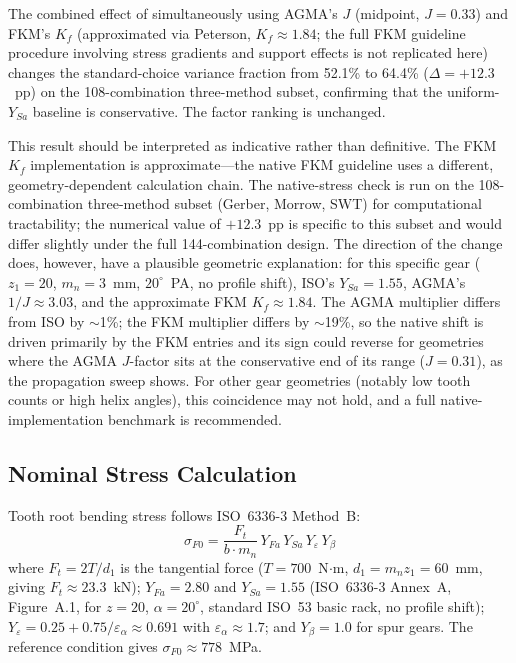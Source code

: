 \documentclass[twocolumn,12pt,a4paper]{article}
\begin{document}
The combined effect of simultaneously using AGMA's $J$ (midpoint,
$J=0.33$) and FKM's $K_f$ (approximated via Peterson,
$K_f \approx 1.84$; the full FKM guideline procedure involving stress
gradients and support effects is not replicated here) changes the
standard-choice variance fraction from 52.1\% to 64.4\%
($\Delta = +12.3$~pp) on the 108-combination three-method subset,
confirming that the uniform-$Y_{Sa}$ baseline is conservative. The
factor ranking is unchanged.

This result should be interpreted as indicative rather than
definitive. The FKM $K_f$ implementation is approximate---the native
FKM guideline uses a different, geometry-dependent calculation chain.
The native-stress check is run on the 108-combination
three-method subset (Gerber, Morrow, SWT) for computational
tractability; the numerical value of $+12.3$~pp is specific to this
subset and would differ slightly under the full 144-combination
design. The direction of the change does, however,
have a plausible geometric explanation: for this specific gear
($z_1=20$, $m_n=3$~mm, $20^\circ$~PA, no profile shift), ISO's
$Y_{Sa}=1.55$, AGMA's $1/J \approx 3.03$, and the approximate FKM
$K_f \approx 1.84$. The AGMA multiplier differs from ISO by
$\sim$1\%; the FKM multiplier differs by $\sim$19\%, so the native
shift is driven primarily by the FKM entries and its sign could
reverse for geometries where the AGMA $J$-factor sits at the
conservative end of its range ($J = 0.31$), as the propagation sweep
shows. For other gear geometries (notably low
tooth counts or high helix angles), this coincidence may not hold, and
a full native-implementation benchmark is recommended.

\subsection{Nominal Stress Calculation}

Tooth root bending stress follows ISO~6336-3 Method~B:
\begin{equation}
\label{eq:sigma_F0}
\sigma_{F0} = \frac{F_t}{b \cdot m_n} \,
Y_{Fa} \, Y_{Sa} \, Y_\varepsilon \, Y_\beta
\end{equation}
where $F_t = 2T/d_1$ is the tangential force ($T=700$~N$\cdot$m,
$d_1 = m_n z_1 = 60$~mm, giving $F_t \approx 23.3$~kN);
$Y_{Fa}=2.80$ and $Y_{Sa}=1.55$ (ISO~6336-3 Annex~A, Figure~A.1,
for $z=20$, $\alpha=20^\circ$, standard ISO~53 basic rack, no profile
shift); $Y_\varepsilon = 0.25 + 0.75/\varepsilon_\alpha \approx 0.691$
with $\varepsilon_\alpha \approx 1.7$; and $Y_\beta = 1.0$ for spur
gears. The reference condition gives $\sigma_{F0} \approx 778$~MPa.
\end{document}
